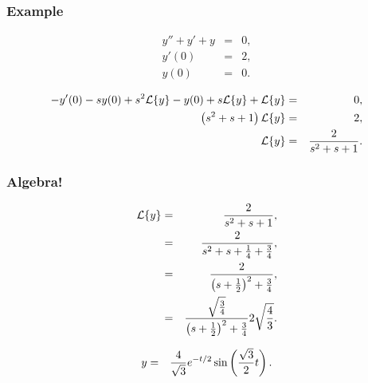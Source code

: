 \begin{frame}
  \frametitle{Example}

  \begin{eqnarray*}
    y''+y'+y & = & 0, \\
    y'(0) & = & 2, \\
    y(0) & = & 0.
  \end{eqnarray*}

  {
    \begin{eqnarray*}
      -y'(0) - sy(0) + s^2 \laplace{y} - y(0) + s \laplace{y} + \laplace{y} & = & 0, \\
      \lp s^2+s+1 \rp \laplace{y} & = & 2, \\
      \laplace{y} & = & \frac{2}{s^2+s+1}.
    \end{eqnarray*}
        
  }

\end{frame}


\begin{frame}
  \frametitle{Algebra!}

  \begin{eqnarray*}
    \laplace{y} & = & \frac{2}{s^2+s+1}, \\
    & = & \frac{2}{s^2+s+\frac{1}{4} + \frac{3}{4}}, \\
    & = & \frac{2}{\lp s + \half \rp^2 + \frac{3}{4}}, \\
    & = & \frac{\sqrt{\frac{3}{4}}}{\lp s + \half \rp^2 + \frac{3}{4}} 2 \sqrt{\frac{4}{3}}.
  \end{eqnarray*}

  {
    \begin{eqnarray*}
      y & = & \frac{4}{\sqrt{3}} e^{-t/2}\sin\left(\frac{\sqrt{3}}{2} t\right).
    \end{eqnarray*}
  }

\end{frame}



